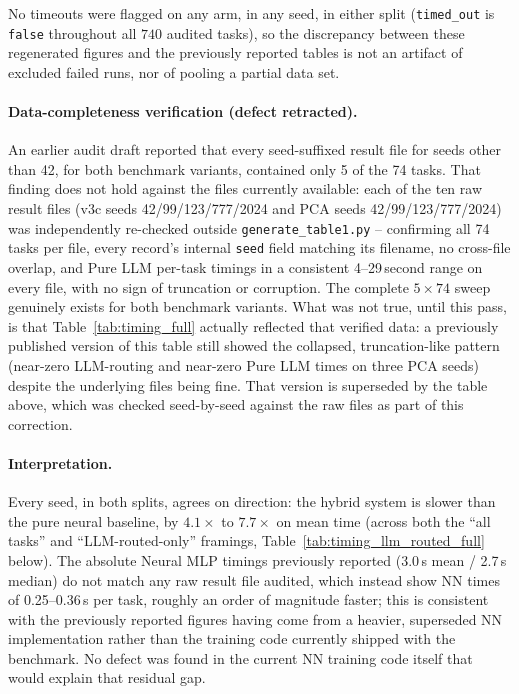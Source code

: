 \documentclass[twoside,11pt]{article}
\begin{document}
No timeouts were flagged on any arm, in any seed, in either split
(\texttt{timed\_out} is \texttt{false} throughout all $740$ audited
tasks), so the discrepancy between these regenerated figures and the
previously reported tables is not an artifact of excluded failed runs,
nor of pooling a partial data set.

\paragraph{Data-completeness verification (defect retracted).}
\label{sec:timing_data_defect}
An earlier audit draft reported that every seed-suffixed result file for
seeds other than 42, for both benchmark variants, contained only 5 of the
74 tasks. That finding does not hold against the files currently
available: each of the ten raw result files (v3c seeds 42/99/123/777/2024
and PCA seeds 42/99/123/777/2024) was independently re-checked outside
\texttt{generate\_table1.py} -- confirming all 74 tasks per file, every
record's internal \texttt{seed} field matching its filename, no
cross-file overlap, and Pure LLM per-task timings in a consistent
4--29\,second range on every file, with no sign of truncation or
corruption. The complete $5\times74$ sweep genuinely exists for both
benchmark variants. What was not true, until this pass, is that
Table~\ref{tab:timing_full} actually reflected that verified data: a
previously published version of this table still showed the collapsed,
truncation-like pattern (near-zero LLM-routing and near-zero Pure LLM
times on three PCA seeds) despite the underlying files being fine. That
version is superseded by the table above, which was checked seed-by-seed
against the raw files as part of this correction.

\paragraph{Interpretation.}
Every seed, in both splits, agrees on direction: the hybrid system is
slower than the pure neural baseline, by $4.1\times$ to $7.7\times$ on
mean time (across both the ``all tasks'' and ``LLM-routed-only''
framings, Table~\ref{tab:timing_llm_routed_full} below). The absolute
Neural MLP timings previously reported (3.0\,s mean / 2.7\,s median) do
not match any raw result file audited, which instead show NN times of
0.25--0.36\,s per task, roughly an order of magnitude faster; this is
consistent with the previously reported figures having come from a
heavier, superseded NN implementation rather than the training code
currently shipped with the benchmark. No defect was found in the current
NN training code itself that would explain that residual gap.
\end{document}
